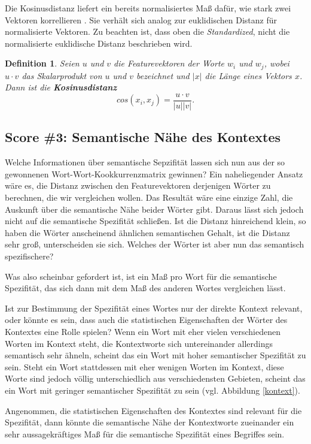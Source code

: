 \documentclass[11pt,numbers=noenddot]{scrartcl}
\newtheorem*{defi}{Definition}
\begin{document}
Die Kosinusdistanz liefert ein bereits normalisiertes Maß dafür, wie stark zwei Vektoren korrellieren \citep[S. 300]{manning1999}. Sie verhält sich analog zur euklidischen Distanz für normalisierte Vektoren. Zu beachten ist, dass oben die \emph{Standardized}, nicht die normalisierte euklidische Distanz beschrieben wird.

\begin{defi}
Seien $u$ und $v$ die Featurevektoren der Worte $w_i$ und $w_j$, wobei $u \cdot v$ das Skalarprodukt von $u$ und $v$ bezeichnet und $|x|$ die Länge eines Vektors $x$. Dann ist die \textbf{Kosinusdistanz}
$$
    cos(x_i, x_j) = \frac{u \cdot v}{|u||v|}.
$$
\end{defi}


\subsection{Score \#3: Semantische Nähe des Kontextes}

Welche Informationen über semantische Sepzifität lassen sich nun aus der so gewonnenen Wort-Wort-Kookkurrenzmatrix gewinnen? Ein naheliegender Ansatz wäre es, die Distanz zwischen den Featurevektoren derjenigen Wörter zu berechnen, die wir vergleichen wollen. Das Resultät wäre eine einzige Zahl, die Auskunft über die semantische Nähe beider Wörter gibt. Daraus lässt sich jedoch nicht auf die semantische Spezifität schließen. Ist die Distanz hinreichend klein, so haben die Wörter anscheinend ähnlichen semantischen Gehalt, ist die Distanz sehr groß, unterscheiden sie sich. Welches der Wörter ist aber nun das semantisch spezifischere?

Was also scheinbar gefordert ist, ist ein Maß pro Wort für die semantische Spezifität, das sich dann mit dem Maß des anderen Wortes vergleichen lässt.

Ist zur Bestimmung der Spezifität eines Wortes nur der direkte Kontext relevant, oder könnte es sein, dass auch die statistischen Eigenschaften der Wörter des Kontextes eine Rolle spielen? Wenn ein Wort mit eher vielen verschiedenen Worten im Kontext steht, die Kontextworte sich untereinander allerdings semantisch sehr ähneln, scheint das ein Wort mit hoher semantischer Spezifität zu sein. Steht ein Wort stattdessen mit eher wenigen Worten im Kontext, diese Worte sind jedoch völlig unterschiedlich aus verschiedensten Gebieten, scheint das ein Wort mit geringer semantischer Spezifität zu sein (vgl. Abbildung \ref{kontext}).

Angenommen, die statistischen Eigenschaften des Kontextes sind relevant für die Spezifität, dann könnte die semantische Nähe der Kontextworte zueinander ein sehr aussagekräftiges Maß für die semantische Spezifität eines Begriffes sein.
\end{document}
